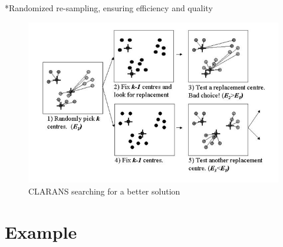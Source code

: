\documentclass[12pt,twoside]{amherstthesis}
\begin{document}
  *Randomized re-sampling, ensuring efficiency and quality
  
  \begin{Shaded}
  \begin{Highlighting}[]
  
  \NormalTok{(} \NormalTok{, }
         \NormalTok{, }
         \NormalTok{, } \NormalTok{, } \NormalTok{)}
  \end{Highlighting}
  \end{Shaded}
  
  \begin{figure}[htbp]
  \centering
  \includegraphics[scale = 0.5,angle = 0]{clustering_pic.png}
  \caption[CLARANS searching for a better solution]{\normalsize{CLARANS searching for a better solution}}
  \label{fig:CLARANS}
  \end{figure}
  
  \chapter{Example}\label{typeset-equ}
  
  \begin{Shaded}
  \begin{Highlighting}[]
  \end{Highlighting}
  \end{Shaded}
  
\end{document}
